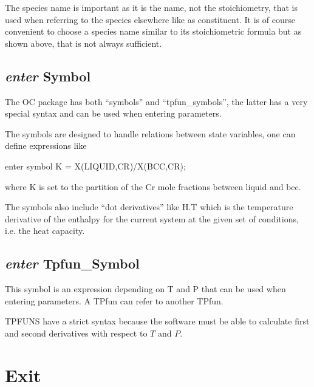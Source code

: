 \documentclass[12pt]{article}
\begin{document}
The species name is important as it is the name, not the
stoichiometry, that is used when referring to the species elsewhere
like as constituent.  It is of course convenient to choose a species
name similar to its stoichiometric formula but as shown above, that is
not always sufficient.

\subsection{{\em enter} Symbol}

The OC package has both ``symbols'' and ``tpfun\_symbols'', the latter
has a very special syntax and can be used when entering parameters.

The symbols are designed to handle relations between state variables,
one can define expressions like 

enter symbol K = X(LIQUID,CR)/X(BCC,CR);

where K is set to the partition of the Cr mole fractions between
liquid and bcc.

The symbols also include ``dot derivatives'' like H.T which is the
temperature derivative of the enthalpy for the current system at the
given set of conditions, i.e. the heat capacity.

\subsection{{\em enter} Tpfun\_Symbol}

This symbol is an expression depending on T and P that can be used
when entering parameters.  A TPfun can refer to another TPfun.

TPFUNS have a strict syntax because the software must be able to
calculate first and second derivatives with respect to $T$ and $P$.

\section{Exit }
\end{document}
